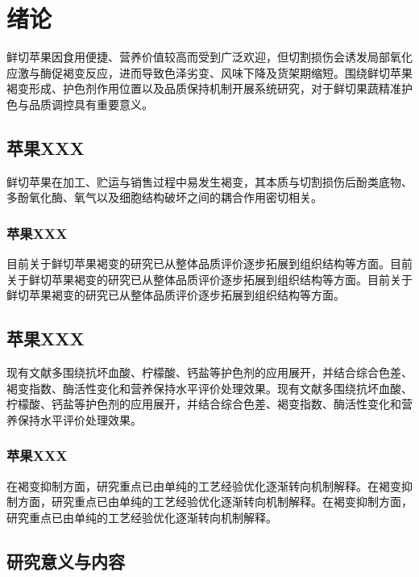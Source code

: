 \chapter{绪论}\label{chap:intro}

鲜切苹果因食用便捷、营养价值较高而受到广泛欢迎\citep{Arnold2022CRFSFS}，但切割损伤会诱发局部氧化应激与酶促褐变反应，进而导致色泽劣变、风味下降及货架期缩短\citep{Fan2023CRFSN}。围绕鲜切苹果褐变形成、护色剂作用位置以及品质保持机制开展系统研究，对于鲜切果蔬精准护色与品质调控具有重要意义。

\section{苹果XXX}\label{sec:intro-background}

鲜切苹果在加工、贮运与销售过程中易发生褐变，其本质与切割损伤后酚类底物、多酚氧化酶、氧气以及细胞结构破坏之间的耦合作用密切相关\citep{Sui2023EBC,Zeng2025FoodControl,Liu2025CRFSFS}。

\subsection{苹果XXX}\label{subsec:intro-status}

目前关于鲜切苹果褐变的研究已从整体品质评价逐步拓展到组织结构等方面。目前关于鲜切苹果褐变的研究已从整体品质评价逐步拓展到组织结构等方面。目前关于鲜切苹果褐变的研究已从整体品质评价逐步拓展到组织结构等方面。

\section{苹果XXX}\label{sec:intro-review}

现有文献多围绕抗坏血酸、柠檬酸、钙盐等护色剂的应用展开，并结合综合色差、褐变指数、酶活性变化和营养保持水平评价处理效果。现有文献多围绕抗坏血酸、柠檬酸、钙盐等护色剂的应用展开，并结合综合色差、褐变指数、酶活性变化和营养保持水平评价处理效果。

\subsection{苹果XXX}\label{subsec:intro-progress}

在褐变抑制方面，研究重点已由单纯的工艺经验优化逐渐转向机制解释。在褐变抑制方面，研究重点已由单纯的工艺经验优化逐渐转向机制解释。在褐变抑制方面，研究重点已由单纯的工艺经验优化逐渐转向机制解释。

\section{研究意义与内容}\label{sec:intro-significance-content}

